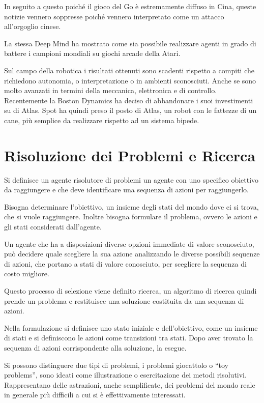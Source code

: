\documentclass{article}
\numberwithin{equation}{subsection}
\begin{document}
In seguito a questo poiché il gioco del Go è estremamente diffuso in Cina, queste notizie vennero soppresse poiché vennero interpretato come un attacco all'orgoglio cinese. 

La stessa Deep Mind ha mostrato come sia possibile realizzare agenti in grado di battere i campioni mondiali su giochi arcade della Atari. 

Sul campo della robotica i risultati ottenuti sono scadenti rispetto a compiti che richiedono autonomia, o interpretazione o in ambienti sconosciuti. Anche se sono molto avanzati in termini della meccanica, elettronica e di controllo. 
Recentemente la Boston Dynamics ha deciso di abbandonare i suoi investimenti su di Atlas. 
Spot ha quindi preso il posto di Atlas, un robot con le fattezze di un cane, più semplice da realizzare rispetto ad un sistema bipede. 


\clearpage

\section{Risoluzione dei Problemi e Ricerca}

Si definisce un agente risolutore di problemi un agente con uno specifico obiettivo da 
raggiungere e che deve identificare una sequenza di azioni per raggiungerlo. 

Bisogna determinare l'obiettivo, un insieme degli stati del mondo dove ci si trova, che 
si vuole raggiungere. 
Inoltre bisogna formulare il problema, ovvero le azioni e gli stati considerati 
dall'agente. 


Un agente che ha a disposizioni diverse opzioni immediate di valore sconosciuto, può decidere 
quale scegliere la sua azione analizzando le diverse possibili sequenze di azioni, che portano 
a stati di valore conosciuto, per scegliere la sequenza di costo migliore. 

Questo processo di selezione viene definito ricerca, un algoritmo di ricerca quindi  
prende un problema e restituisce una soluzione costituita da una sequenza di azioni. 

Nella formulazione si definisce uno stato iniziale e dell'obiettivo, come un insieme di stati 
e si definiscono le azioni come transizioni tra stati. Dopo aver trovato la sequenza di azioni 
corrispondente alla soluzione, la esegue. 


Si possono distinguere due tipi di problemi, i problemi giocattolo o ``toy problems'', sono 
ideati come illustrazione o esercitazione dei metodi risolutivi. Rappresentano delle 
astrazioni, anche semplificate, dei problemi del mondo reale in generale più difficili a cui 
si è effettivamente interessati. 
\end{document}
